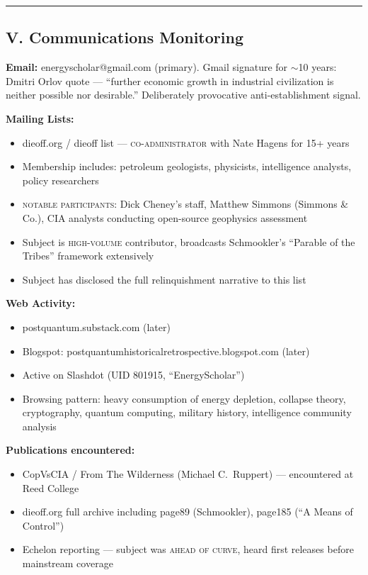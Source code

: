 \vspace{1cm}\hrule\vspace{1cm}

\subsection*{V. Communications Monitoring}
\label{interlude:communications-monitoring}

\textbf{Email:} energyscholar@gmail.com (primary). Gmail signature for $\sim$10 years: Dmitri Orlov quote --- ``further economic growth in industrial civilization is neither possible nor desirable.'' Deliberately provocative anti-establishment signal.

\textbf{Mailing Lists:}

\begin{itemize}[nosep]
\item dieoff.org / dieoff list --- \textsc{co-administrator} with Nate Hagens for 15+ years
\item Membership includes: petroleum geologists, physicists, intelligence analysts, policy researchers
\item \textsc{notable participants}: Dick Cheney's staff, Matthew Simmons (Simmons \& Co.), CIA analysts conducting open-source geophysics assessment
\item Subject is \textsc{high-volume} contributor, broadcasts Schmookler's ``Parable of the Tribes'' framework extensively
\item Subject has disclosed the full relinquishment narrative to this list
\end{itemize}

\textbf{Web Activity:}

\begin{itemize}[nosep]
\item postquantum.substack.com (later)
\item Blogspot: postquantumhistoricalretrospective.blogspot.com (later)
\item Active on Slashdot (UID 801915, ``EnergyScholar'')
\item Browsing pattern: heavy consumption of energy depletion, collapse theory, cryptography, quantum computing, military history, intelligence community analysis
\end{itemize}

\textbf{Publications encountered:}

\begin{itemize}[nosep]
\item CopVsCIA / From The Wilderness (Michael C.\ Ruppert) --- encountered at Reed College
\item dieoff.org full archive including page89 (Schmookler), page185 (``A Means of Control'')
\item Echelon reporting --- subject was \textsc{ahead of curve}, heard first releases before mainstream coverage
\end{itemize}

